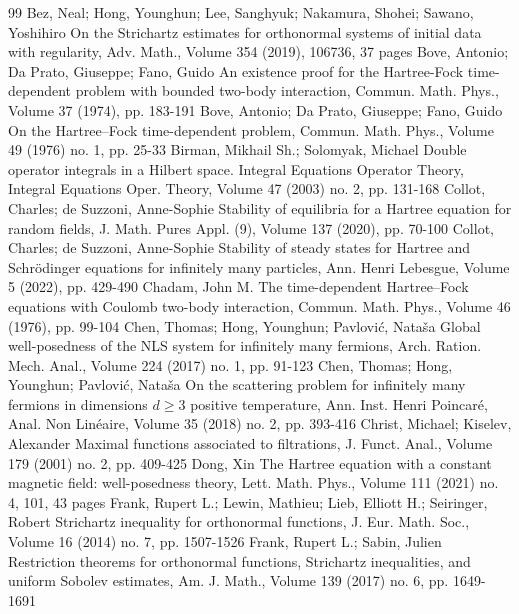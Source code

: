\documentclass[10pt,a4paper]{amsart}
\begin{document}
\begin{thebibliography}{99}
 Bez, Neal; Hong, Younghun; Lee, Sanghyuk; Nakamura, Shohei; Sawano, Yoshihiro On the Strichartz estimates for orthonormal systems of initial data with regularity, Adv. Math., Volume 354 (2019), 106736, 37 pages
 Bove, Antonio; Da Prato, Giuseppe; Fano, Guido An existence proof for the Hartree-Fock time-dependent problem with bounded two-body interaction, Commun. Math. Phys., Volume 37 (1974), pp. 183-191
 Bove, Antonio; Da Prato, Giuseppe; Fano, Guido On the Hartree–Fock time-dependent problem, Commun. Math. Phys., Volume 49 (1976) no. 1, pp. 25-33
 Birman, Mikhail Sh.; Solomyak, Michael Double operator integrals in a Hilbert space. Integral Equations Operator Theory, Integral Equations Oper. Theory, Volume 47 (2003) no. 2, pp. 131-168
 Collot, Charles; de Suzzoni, Anne-Sophie Stability of equilibria for a Hartree equation for random fields, J. Math. Pures Appl. (9), Volume 137 (2020), pp. 70-100
 Collot, Charles; de Suzzoni, Anne-Sophie Stability of steady states for Hartree and Schrödinger equations for infinitely many particles, Ann. Henri Lebesgue, Volume 5 (2022), pp. 429-490
 Chadam, John M. The time-dependent Hartree–Fock equations with Coulomb two-body interaction, Commun. Math. Phys., Volume 46 (1976), pp. 99-104
 Chen, Thomas; Hong, Younghun; Pavlović, Nataša Global well-posedness of the NLS system for infinitely many fermions, Arch. Ration. Mech. Anal., Volume 224 (2017) no. 1, pp. 91-123
 Chen, Thomas; Hong, Younghun; Pavlović, Nataša On the scattering problem for infinitely many fermions in dimensions $d \ge 3$ positive temperature, Ann. Inst. Henri Poincaré, Anal. Non Linéaire, Volume 35 (2018) no. 2, pp. 393-416
 Christ, Michael; Kiselev, Alexander Maximal functions associated to filtrations, J. Funct. Anal., Volume 179 (2001) no. 2, pp. 409-425
 Dong, Xin The Hartree equation with a constant magnetic field: well-posedness theory, Lett. Math. Phys., Volume 111 (2021) no. 4, 101, 43 pages
 Frank, Rupert L.; Lewin, Mathieu; Lieb, Elliott H.; Seiringer, Robert Strichartz inequality for orthonormal functions, J. Eur. Math. Soc., Volume 16 (2014) no. 7, pp. 1507-1526
 Frank, Rupert L.; Sabin, Julien Restriction theorems for orthonormal functions, Strichartz inequalities, and uniform Sobolev estimates, Am. J. Math., Volume 139 (2017) no. 6, pp. 1649-1691

\end{thebibliography}
\end{document}
